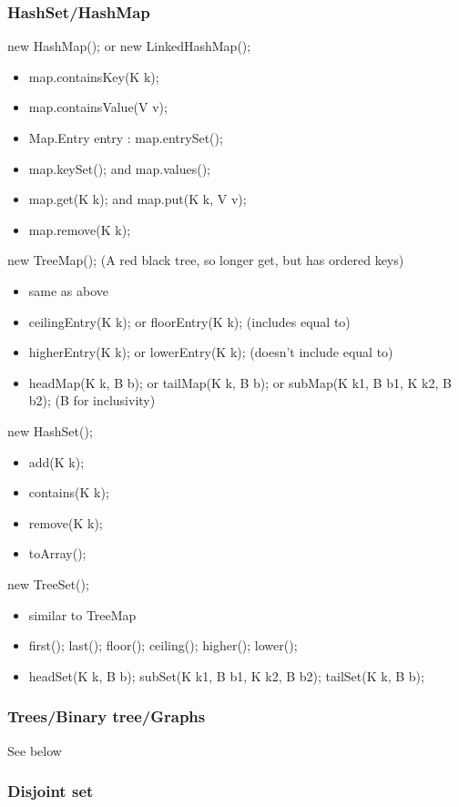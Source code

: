 \documentclass{article}
\begin{document}
\subsubsection{HashSet/HashMap}
new HashMap(); or new LinkedHashMap();
\begin{itemize}
    \item map.containsKey(K k);
    \item map.containsValue(V v);
    \item Map.Entry entry : map.entrySet();
    \item map.keySet(); and map.values();
    \item map.get(K k); and map.put(K k, V v);
    \item map.remove(K k);
\end{itemize}
new TreeMap(); (A red black tree, so longer get, but has ordered keys)
\begin{itemize}
    \item same as above
    \item ceilingEntry(K k); or floorEntry(K k); (includes equal to)
    \item higherEntry(K k); or lowerEntry(K k); (doesn't include equal to)
    \item headMap(K k, B b); or tailMap(K k, B b); or subMap(K k1, B b1, K k2, B b2); (B for inclusivity)
\end{itemize}
new HashSet();
\begin{itemize}
    \item add(K k);
    \item contains(K k);
    \item remove(K k);
    \item toArray();
\end{itemize}
new TreeSet();
\begin{itemize}
    \item similar to TreeMap
    \item first(); last(); floor(); ceiling(); higher(); lower();
    \item headSet(K k, B b); subSet(K k1, B b1, K k2, B b2); tailSet(K k, B b);
\end{itemize}
\subsubsection{Trees/Binary tree/Graphs}
See below
\subsubsection{Disjoint set}
\end{document}

